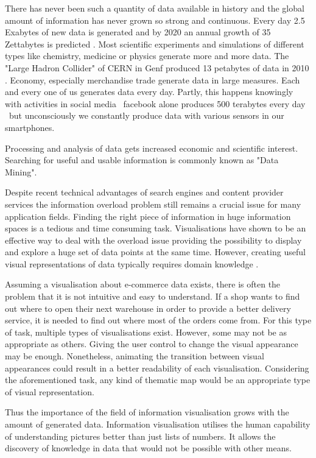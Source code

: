There has never been such a quantity of data available in history and the global amount of information has never grown so strong and continuous. Every day 2.5 Exabytes of new data is generated and by 2020 an annual growth of 35 Zettabytes is predicted . Most scientific experiments and simulations of different types like chemistry, medicine or physics generate more and more data. The "Large Hadron Collider" of CERN in Genf produced 13 petabytes of data in 2010 . Economy, especially merchandise trade generate data in large measures. Each and every one of us generates data every day. Partly, this happens knowingly with activities in social media \textendash\ facebook alone produces 500 terabytes every day  \textendash\ but unconsciously we constantly produce data with various sensors in our smartphones.

Processing and analysis of data gets increased economic and scientific interest. Searching for useful and usable information is commonly known as "Data Mining".

Despite recent technical advantages of search engines and content provider services the information overload problem still remains a crucial issue for many application fields. Finding the right piece of information in huge information spaces is a tedious and time consuming task. Visualisations have shown to be an effective way to deal with the overload issue providing the possibility to display and explore a huge set of data points at the same time. However, creating useful visual representations of data typically requires domain knowledge .

Assuming a visualisation about e-commerce data exists, there is often the problem that it is not intuitive and easy to understand. If a shop wants to find out where to open their next warehouse in order to provide a better delivery service, it is needed to find out where most of the orders come from. For this type of task, multiple types of visualisations exist. However, some may not be as appropriate as others. Giving the user control to change the visual appearance may be enough. Nonetheless, animating the transition between visual appearances could result in a better readability of each visualisation. Considering the aforementioned task, any kind of thematic map would be an appropriate type of visual representation.

Thus the importance of the field of information visualisation grows with the amount of generated data. Information visualisation utilises the human capability of understanding pictures better than just lists of numbers. It allows the discovery of knowledge in data that would not be possible with other means.